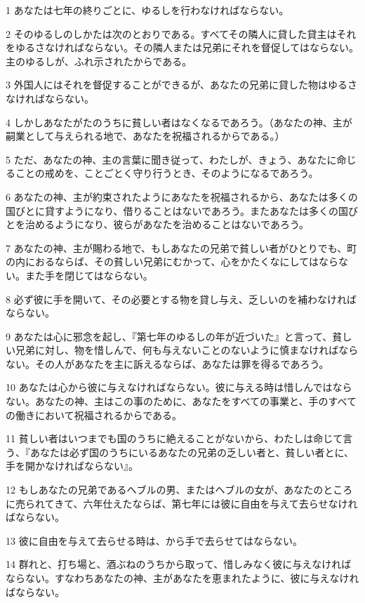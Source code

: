 \par 1 あなたは七年の終りごとに、ゆるしを行わなければならない。
\par 2 そのゆるしのしかたは次のとおりである。すべてその隣人に貸した貸主はそれをゆるさなければならない。その隣人または兄弟にそれを督促してはならない。主のゆるしが、ふれ示されたからである。
\par 3 外国人にはそれを督促することができるが、あなたの兄弟に貸した物はゆるさなければならない。
\par 4 しかしあなたがたのうちに貧しい者はなくなるであろう。（あなたの神、主が嗣業として与えられる地で、あなたを祝福されるからである。）
\par 5 ただ、あなたの神、主の言葉に聞き従って、わたしが、きょう、あなたに命じることの戒めを、ことごとく守り行うとき、そのようになるであろう。
\par 6 あなたの神、主が約束されたようにあなたを祝福されるから、あなたは多くの国びとに貸すようになり、借りることはないであろう。またあなたは多くの国びとを治めるようになり、彼らがあなたを治めることはないであろう。
\par 7 あなたの神、主が賜わる地で、もしあなたの兄弟で貧しい者がひとりでも、町の内におるならば、その貧しい兄弟にむかって、心をかたくなにしてはならない。また手を閉じてはならない。
\par 8 必ず彼に手を開いて、その必要とする物を貸し与え、乏しいのを補わなければならない。
\par 9 あなたは心に邪念を起し、『第七年のゆるしの年が近づいた』と言って、貧しい兄弟に対し、物を惜しんで、何も与えないことのないように慎まなければならない。その人があなたを主に訴えるならば、あなたは罪を得るであろう。
\par 10 あなたは心から彼に与えなければならない。彼に与える時は惜しんではならない。あなたの神、主はこの事のために、あなたをすべての事業と、手のすべての働きにおいて祝福されるからである。
\par 11 貧しい者はいつまでも国のうちに絶えることがないから、わたしは命じて言う、『あなたは必ず国のうちにいるあなたの兄弟の乏しい者と、貧しい者とに、手を開かなければならない』。
\par 12 もしあなたの兄弟であるヘブルの男、またはヘブルの女が、あなたのところに売られてきて、六年仕えたならば、第七年には彼に自由を与えて去らせなければならない。
\par 13 彼に自由を与えて去らせる時は、から手で去らせてはならない。
\par 14 群れと、打ち場と、酒ぶねのうちから取って、惜しみなく彼に与えなければならない。すなわちあなたの神、主があなたを恵まれたように、彼に与えなければならない。
